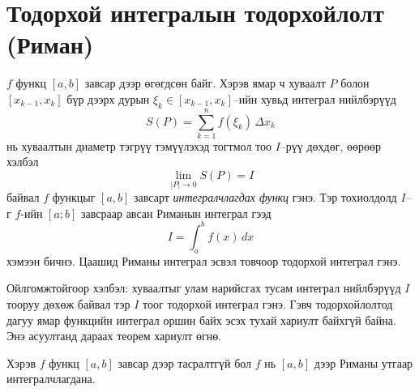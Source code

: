 \section{Тодорхой интегралын тодорхойлолт (Риман)}

\begin{definition}
$f$ функц $[a,b]$ завсар дээр өгөгдсөн байг. Хэрэв
ямар ч хуваалт $P$ болон $[x_{k-1},x_k]$ бүр дээрх дурын $\xi_k\in[x_{k-1},x_k]$–ийн хувьд интеграл нийлбэрүүд
\[
S(P) = \sum_{k=1}^n f(\xi_k)\,\Delta x_k
\]
нь хуваалтын диаметр тэгрүү тэмүүлэхэд тогтмол тоо $I$–рүү дөхдөг, өөрөөр хэлбэл
\[
\lim\limits_{|P|\to 0} S(P)=I
\]
байвал $f$ функцыг $[a,b]$ завсарт \emph{интегралчлагдах функц} гэнэ.
Тэр тохиолдолд $I$–г $f$-ийн $[a;b]$ завсраар авсан  Риманын интеграл гээд
\[
I = \int_a^b f(x)\,dx
\]
хэмээн бичнэ. Цаашид Риманы интеграл эсвэл товчоор тодорхой интеграл гэнэ.
\end{definition}

Ойлгомжтойгоор хэлбэл: хуваалтыг улам нарийсгах тусам интеграл нийлбэрүүд
$I$ тооруу дөхөж байвал тэр $I$ тоог тодорхой интеграл гэнэ. Гэвч тодорхойлолтод дагуу ямар функцийн интеграл оршин байх эсэх тухай хариулт байхгүй байна. Энэ асуултанд дараах теорем хариулт өгнө.  
\begin{theorem}
Хэрэв $f$ функц $[a,b]$ завсар дээр тасралтгүй бол
$f$ нь $[a,b]$ дээр Риманы утгаар интегралчлагдана.
\end{theorem}

